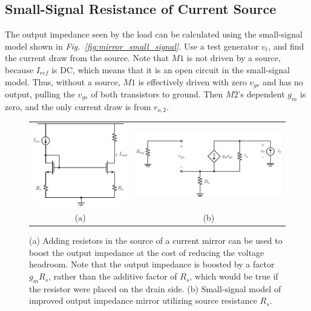 \subsection{Small-Signal Resistance of Current Source}
The output impedance seen by the load can be calculated using the small-signal model shown in \emph{Fig.~\ref{fig:mirror_small_signal}}.  Use a test generator $v_t$, and find the current draw from the source.  Note that $M1$ is not driven by a source, because $I_{ref}$ is DC, which means that it is an open circuit in the small-signal model.  Thus, without a source, $M1$ is effectively driven with zero $v_{gs}$ and has no output, pulling the $v_{gs}$ of both transistors to ground.  Then $M2$'s dependent $g_m$ is zero, and the only current draw is from $r_{o,2}$.
\newpage
\begin{figure}[t]
\centering
\begin{tabular}{c c}
\includegraphics[scale=.85]{9mirror_Rs.pdf} & \includegraphics[scale=.85]{10mirrror_Rs_ss.pdf}\\
(a) & (b)
\end{tabular}
\caption{(a) Adding resistors in the source of a current mirror can be used to boost the output impedance at the cost of reducing the voltage headroom.  Note that the output impedance is boosted by a factor $g_m R_s$, rather than the additive factor of $R_s$, which would be true if the resistor were placed on the drain side.  (b) Small-signal model of improved output impedance mirror utilizing source resistance $R_s$.}
\label{fig:mirror_Rs}
\end{figure}
